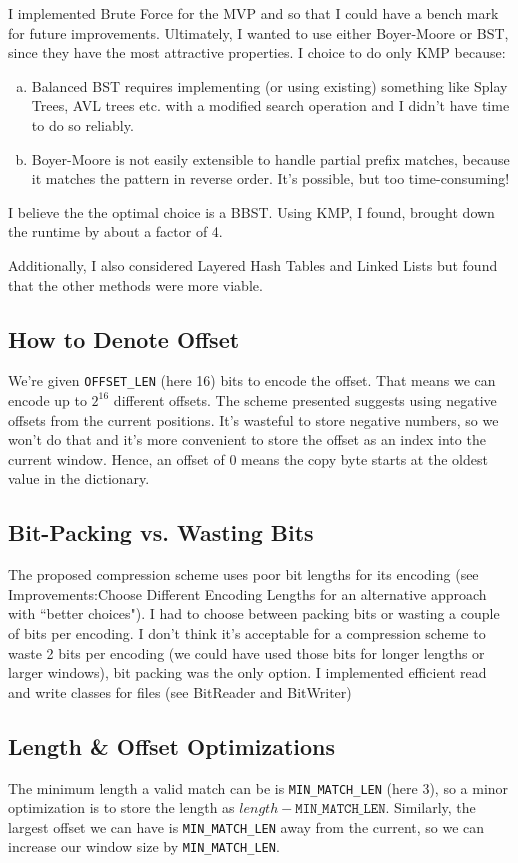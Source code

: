 \documentclass[a4paper]{article}
\begin{document}
I implemented Brute Force for the MVP and so that I could have a bench mark for future improvements.
Ultimately, I wanted to use either Boyer-Moore or BST, since they have the most attractive properties. I choice to do only KMP because:
\begin{enumerate}[a)]
\item Balanced BST requires implementing (or using existing) something like Splay Trees, AVL trees etc. with a modified search operation and I didn't have time to do so reliably.
\item Boyer-Moore is not easily extensible to handle partial prefix matches, because it matches the pattern in reverse order. It's possible, but too time-consuming!
\end{enumerate}

I believe the the optimal choice is a BBST. Using KMP, I found, brought down the runtime by about a factor of 4.

Additionally, I also considered Layered Hash Tables and Linked Lists but found that the other methods were more viable.
\subsection{How to Denote Offset}
We're given \texttt{OFFSET\_LEN} (here 16) bits to encode the offset. That means we can encode up to \(2^{16}\) different offsets. The scheme presented suggests using negative offsets from the current positions. It's wasteful to store negative numbers, so we won't do that and it's more convenient to store the offset as an index into the current window. Hence, an offset of 0 means the copy byte starts at the oldest value in the dictionary.
\subsection{Bit-Packing vs. Wasting Bits}
The proposed compression scheme uses poor bit lengths for its encoding (see Improvements:Choose Different Encoding Lengths for an alternative approach with ``better choices"). I had to choose between packing bits or wasting a couple of bits per encoding. I don't think it's acceptable for a compression scheme to waste 2 bits per encoding (we could have used those bits for longer lengths or larger windows), bit packing was the only option. I implemented efficient read and write classes for files (see BitReader and BitWriter)
\subsection{Length \& Offset Optimizations}
The minimum length a valid match can be is \texttt{MIN\_MATCH\_LEN} (here 3), so a minor optimization is to store the length as \(length - \texttt{MIN\_MATCH\_LEN}\). Similarly, the largest offset we can have is \texttt{MIN\_MATCH\_LEN} away from the current, so we can increase our window size by \texttt{MIN\_MATCH\_LEN}.
\end{document}

